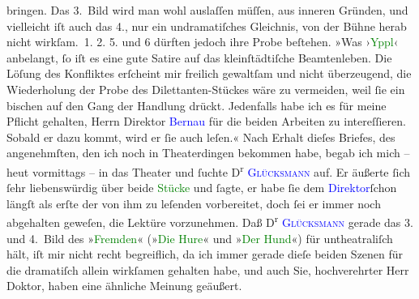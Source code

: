                     bringen. Das 3. Bild wird man wohl auslaſſen müſſen, aus inneren Gründen, und
                    vielleicht iſt auch das 4., nur ein undramatiſches Gleichnis, von der Bühne
                    herab nicht wirkſam. 1.{ }2.{ }5. und 6 dürften jedoch ihre Probe beſtehen.\pend
           \pstart
           »Was ›\textcolor{green}{Yppl}{}\ledrightnote{\textcolor{green}{Yppl. Idylle in fünf Akten}}‹ anbelangt, ſo iſt es eine gute
                    Satire auf das kleinſtädtiſche Beamtenleben. Die Löſung des Konfliktes erſcheint
                    mir freilich gewaltſam und nicht überzeugend, die Wiederholung der Probe des
                    Dilettanten-Stückes wäre zu vermeiden, weil ſie ein bischen auf den Gang der
                    Handlung drückt. Jedenfalls habe ich es für meine Pflicht gehalten, Herrn
                    Direktor \textcolor{blue}{Bernau}{}\ledrightnote{\textcolor{blue}{Alfred Bernau}} für die beiden Arbeiten zu
                    intereſſieren. Sobald er dazu kommt, wird er ſie auch leſen.«\pend
           \pstart
           Nach Erhalt dieſes Briefes, des angenehmſten, den ich noch in Theaterdingen
                    bekommen habe, begab ich mich – heut vormittags – in das Theater und ſuchte D\textsuperscript{r}{ }\textcolor{blue}{\textsc{Glücksmann}}{}\ledrightnote{\textcolor{blue}{Heinrich Glücksmann}} auf. Er äußerte ſich ſehr liebenswürdig {\pb}über beide \textcolor{green}{Stücke}{} und ſagte, er habe ſie dem
                        \textcolor{blue}{Direktor}{}ſchon längſt
                    als erſte der von ihm zu leſenden vorbereitet, doch ſei er immer noch abgehalten
                    geweſen, die Lektüre vorzunehmen.\pend
           \pstart
           Daß D\textsuperscript{r}{ }\textcolor{blue}{\textsc{Glücksmann}}{}\ledrightnote{\textcolor{blue}{Heinrich Glücksmann}} gerade das 3. und 4. Bild des »\textcolor{green}{Fremden}{}\ledrightnote{\textcolor{green}{Yppl. Idylle in fünf Akten}}«
                        (»\textcolor{green}{Die Hure}{}« und »\textcolor{green}{Der Hund}{}«) für
                    untheatraliſch hält, iſt mir nicht recht begreiflich, da ich immer gerade dieſe
                    beiden Szenen für die dramatiſch allein wirkſamen gehalten habe, und auch Sie,
                    hochverehrter Herr Doktor, haben eine ähnliche Meinung geäußert.\pend
